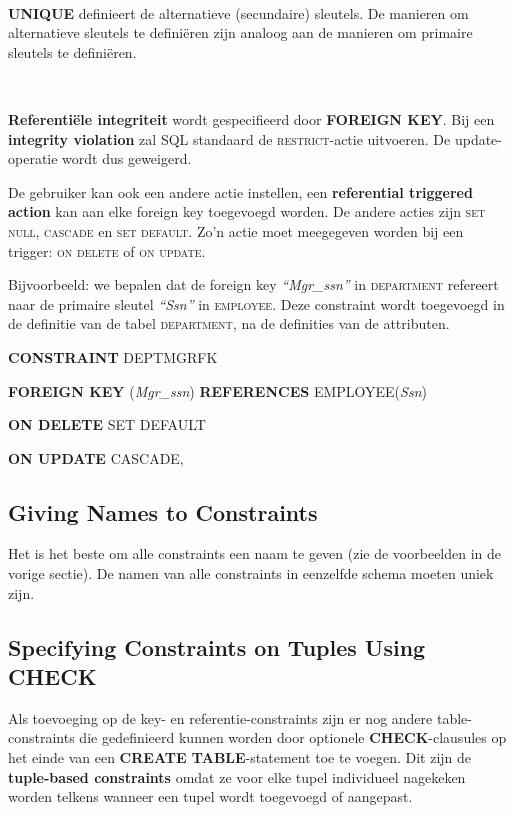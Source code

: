~

\noindent \textbf{UNIQUE} definieert de alternatieve (secundaire) sleutels. De manieren om alternatieve sleutels te defini\"eren zijn analoog aan de manieren om primaire sleutels te defini\"eren.

~

\noindent \textbf{Referenti\"ele integriteit} wordt gespecifieerd door \textbf{FOREIGN KEY}. Bij een \textbf{integrity violation} zal SQL standaard de \textsc{restrict}-actie uitvoeren. De update-operatie wordt dus geweigerd.

De gebruiker kan ook een andere actie instellen, een \textbf{referential triggered action} kan aan elke foreign key toegevoegd worden. De andere acties zijn \textsc{set null}, \textsc{cascade} en \textsc{set default}. Zo'n actie moet meegegeven worden bij een trigger: \textsc{on delete} of \textsc{on update}.

Bijvoorbeeld: we bepalen dat de foreign key \textit{``Mgr\_ssn''} in \textsc{department} refereert naar de primaire sleutel \textit{``Ssn''} in \textsc{employee}. Deze constraint wordt toegevoegd in de definitie van de tabel \textsc{department}, na de definities van de attributen.

\vspace{1mm}\hspace{10mm}
\textbf{CONSTRAINT} DEPTMGRFK

\hspace{15mm}
\textbf{FOREIGN KEY} (\textit{Mgr\_ssn}) \textbf{REFERENCES} EMPLOYEE(\textit{Ssn})

\hspace{35mm}
\textbf{ON DELETE} SET DEFAULT

\hspace{35mm}
\textbf{ON UPDATE} CASCADE,


\subsection{Giving Names to Constraints}
Het is het beste om alle constraints een naam te geven (zie de voorbeelden in de vorige sectie). De namen van alle constraints in eenzelfde schema moeten uniek zijn.


\subsection{Specifying Constraints on Tuples Using CHECK}
Als toevoeging op de key- en referentie-constraints zijn er nog andere table-constraints die gedefinieerd kunnen worden door optionele \textbf{CHECK}-clausules op het einde van een \textbf{CREATE TABLE}-statement toe te voegen. Dit zijn de \textbf{tuple-based constraints} omdat ze voor elke tupel individueel nagekeken worden telkens wanneer een tupel wordt toegevoegd of aangepast. 

